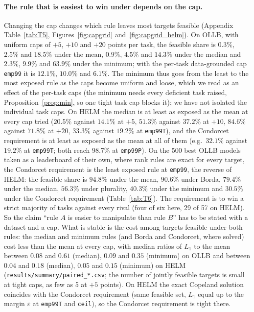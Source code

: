 \documentclass{article}
\begin{document}
\paragraph{The rule that is easiest to win under depends on the cap.}
Changing the cap changes which rule leaves most targets feasible (Appendix Table~\ref{tab:T5}, Figures~\ref{fig:capgrid} and~\ref{fig:capgrid_helm}). On OLLB, with uniform caps of $+5$, $+10$ and $+20$ points per task, the feasible share is $0.3\%$, $2.5\%$ and $18.5\%$ under the mean, $0.9\%$, $4.5\%$ and $14.3\%$ under the median and $2.3\%$, $9.9\%$ and $63.9\%$ under the minimum; with the per-task data-grounded cap \texttt{emp99} it is $12.1\%$, $10.0\%$ and $6.1\%$. The minimum thus goes from the least to the most exposed rule as the caps become uniform and loose, which we read as an effect of the per-task caps (the minimum needs every deficient task raised, Proposition~\ref{prop:min}, so one tight task cap blocks it); we have not isolated the individual task caps. On HELM the median is at least as exposed as the mean at every cap tried ($20.5\%$ against $14.1\%$ at $+5$, $51.3\%$ against $37.2\%$ at $+10$, $84.6\%$ against $71.8\%$ at $+20$, $33.3\%$ against $19.2\%$ at \texttt{emp99T}), and the Condorcet requirement is at least as exposed as the mean at all of them (e.g.\ $32.1\%$ against $19.2\%$ at \texttt{emp99T}; both reach $98.7\%$ at \texttt{emp99P}). On the 500 best OLLB models taken as a leaderboard of their own, where rank rules are exact for every target, the Condorcet requirement is the least exposed rule at \texttt{emp99}, the reverse of HELM: the feasible share is $94.8\%$ under the mean, $90.6\%$ under Borda, $79.4\%$ under the median, $56.3\%$ under plurality, $40.3\%$ under the minimum and $30.5\%$ under the Condorcet requirement (Table~\ref{tab:T6}). The requirement is to win a strict majority of tasks against every rival (four of six here, 29 of 57 on HELM). So the claim ``rule $A$ is easier to manipulate than rule $B$'' has to be stated with a dataset and a cap. What is stable is the cost among targets feasible under both rules: the median and minimum rules (and Borda and Condorcet, where solved) cost less than the mean at every cap, with median ratios of $L_1$ to the mean between $0.08$ and $0.61$ (median), $0.09$ and $0.35$ (minimum) on OLLB and between $0.04$ and $0.18$ (median), $0.05$ and $0.15$ (minimum) on HELM (\texttt{results/summary/paired\_*.csv}; the number of jointly feasible targets is small at tight caps, as few as 5 at $+5$ points). On HELM the exact Copeland solution coincides with the Condorcet requirement (same feasible set, $L_1$ equal up to the margin $\varepsilon$ at \texttt{emp99T} and \texttt{ceil}), so the Condorcet requirement is tight there.
\end{document}
